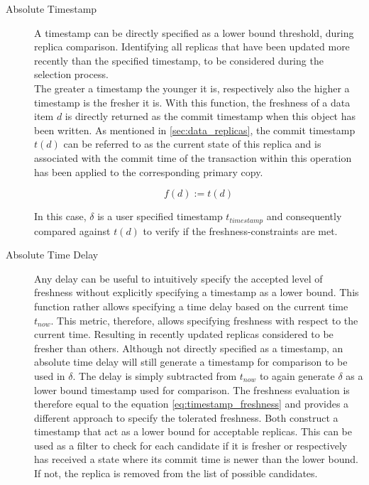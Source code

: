 \begin{description} \label{desc}
    \item [Absolute Timestamp]  A timestamp can be directly specified as a lower bound threshold, during replica comparison. Identifying all replicas that have been updated 
    more recently than the specified timestamp, to be considered during the selection process.\\
    The greater a timestamp the younger it is, respectively also the higher a timestamp is the fresher it is.
    With this function, the freshness of a data item $d$ is directly returned as the commit timestamp when this object has been written.
    As mentioned in \ref{sec:data_replicas}, the commit timestamp $t(d)$ can be referred to as the current state of this replica and is associated with the commit time 
    of the transaction within this operation has been applied to the corresponding primary copy.

    \begin{equation} \label{eq:timestamp_freshness}
        f(d) := t(d)
    \end{equation}

    In this case, $\delta$ is a user specified timestamp $t_{timestamp}$ and consequently compared against $t(d)$ to verify if the freshness-constraints are met.


    \item [Absolute Time Delay] Any delay can be useful to intuitively specify the accepted level of freshness without explicitly specifying a timestamp as a lower bound.
    This function rather allows specifying a time delay based on the current time $t_{now}$. 
    This metric, therefore, allows specifying freshness with respect to the current time. Resulting in recently updated replicas considered to be fresher than others. 
    Although not directly specified as a timestamp, an absolute time delay will still generate a timestamp for comparison to be used in $\delta$.
    The delay is simply subtracted from $t_{now}$ to again generate $\delta$ as a lower bound timestamp used for comparison.
    The freshness evaluation is therefore equal to the equation \ref{eq:timestamp_freshness} and provides a different approach to specify the tolerated freshness.
    Both construct a timestamp that act as a lower bound for acceptable replicas.
    This can be used as a filter to check for each candidate if it is fresher or respectively has received a state where its commit time is newer 
    than the lower bound. If not, the replica is removed from the list of possible candidates. 




\end{description}

